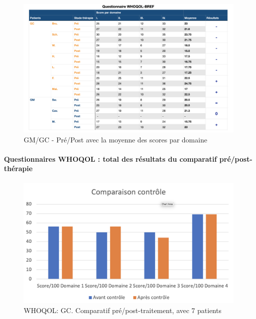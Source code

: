  
 \begin{figure}
 	\centering
 	\includegraphics[width=\linewidth]{images/graphiques/questionnaire_wq.png}
 	\caption[Questionnaire WHOQOL-BREF]{GM/GC - Pré/Post avec la moyenne des scores par 
 		domaine}
 	
 \end{figure}
 
 
 
 
 
 \paragraph{Questionnaires WHOQOL : total des résultats du comparatif pré/post-thérapie}
 
 
 
 \begin{figure} [th]
 	\centering
 	\includegraphics[width=\linewidth]{images/Compcontrole.png}
 	\caption[Schéma du déroulement]{WHOQOL:  GC. Comparatif pré/post-traitement, avec 7 patients}
 	
 \end{figure}
 
